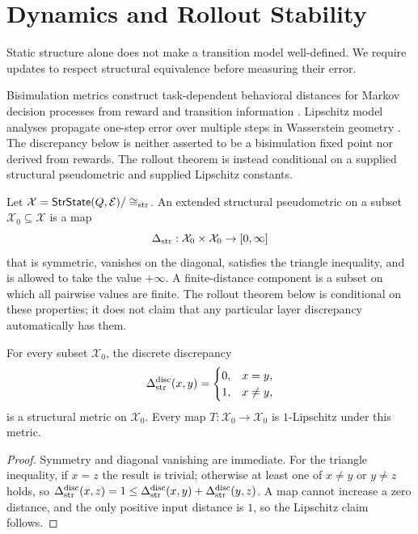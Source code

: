 \section{Dynamics and Rollout Stability}

Static structure alone does not make a transition model well-defined. We require
updates to respect structural equivalence before measuring their error.

Bisimulation metrics construct task-dependent behavioral distances for Markov
decision processes from reward and transition information
\cite{ferns2004metrics}. Lipschitz model analyses propagate one-step error over
multiple steps in Wasserstein geometry \cite{asadi2018lipschitz}. The
discrepancy below is neither asserted to be a bisimulation fixed point nor
derived from rewards. The rollout theorem is instead conditional on a supplied
structural pseudometric and supplied Lipschitz constants.

\begin{definition}
Let $\mathcal X=\mathsf{StrState}(Q,\mathcal E)/\cong_{\mathrm{str}}$. An extended
structural pseudometric on a subset $\mathcal X_0\subseteq\mathcal X$ is a
map
\[
\Delta_{\mathrm{str}}:\mathcal X_0\times\mathcal X_0\to[0,\infty]
\]
that is symmetric, vanishes on the diagonal, satisfies the triangle
inequality, and is allowed to take the value $+\infty$. A finite-distance
component is a subset on which all pairwise values are finite. The rollout
theorem below is conditional on these properties; it does not claim that any
particular layer discrepancy automatically has them.
\end{definition}

\begin{proposition}
For every subset $\mathcal X_0$, the discrete discrepancy
\[
\Delta_{\mathrm{str}}^{\mathrm{disc}}(x,y)=
\begin{cases}0,&x=y,\\1,&x\ne y,\end{cases}
\]
is a structural metric on $\mathcal X_0$. Every map
$T:\mathcal X_0\to\mathcal X_0$ is $1$-Lipschitz under this metric.
\end{proposition}

\begin{proof}
Symmetry and diagonal vanishing are immediate. For the triangle inequality,
if $x=z$ the result is trivial; otherwise at least one of $x\ne y$ or
$y\ne z$ holds, so $\Delta_{\mathrm{str}}^{\mathrm{disc}}(x,z)=1\leq
\Delta_{\mathrm{str}}^{\mathrm{disc}}(x,y)+\Delta_{\mathrm{str}}^{\mathrm{disc}}(y,z)$. A map cannot increase
a zero distance, and the only positive input distance is $1$, so the
Lipschitz claim follows.
\end{proof}

